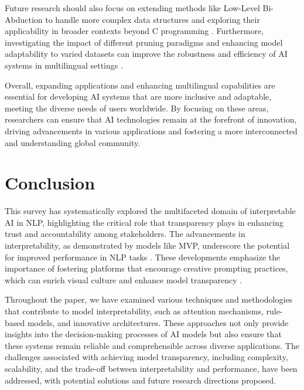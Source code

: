 Future research should also focus on extending methods like Low-Level Bi-Abduction to handle more complex data structures and exploring their applicability in broader contexts beyond C programming \cite{holk2022lowlevelbiabduction}. Furthermore, investigating the impact of different pruning paradigms and enhancing model adaptability to varied datasets can improve the robustness and efficiency of AI systems in multilingual settings \cite{kaur2024cropcontextwiserobuststatic}.



Overall, expanding applications and enhancing multilingual capabilities are essential for developing AI systems that are more inclusive and adaptable, meeting the diverse needs of users worldwide. By focusing on these areas, researchers can ensure that AI technologies remain at the forefront of innovation, driving advancements in various applications and fostering a more interconnected and understanding global community.







\section{Conclusion} \label{sec:Conclusion}





This survey has systematically explored the multifaceted domain of interpretable AI in NLP, highlighting the critical role that transparency plays in enhancing trust and accountability among stakeholders. The advancements in interpretability, as demonstrated by models like MVP, underscore the potential for improved performance in NLP tasks \cite{tang2023mvpmultitasksupervisedpretraining}. These developments emphasize the importance of fostering platforms that encourage creative prompting practices, which can enrich visual culture and enhance model transparency \cite{palmini2024patternscreativityuserinput}.



Throughout the paper, we have examined various techniques and methodologies that contribute to model interpretability, such as attention mechanisms, rule-based models, and innovative architectures. These approaches not only provide insights into the decision-making processes of AI models but also ensure that these systems remain reliable and comprehensible across diverse applications. The challenges associated with achieving model transparency, including complexity, scalability, and the trade-off between interpretability and performance, have been addressed, with potential solutions and future research directions proposed.



